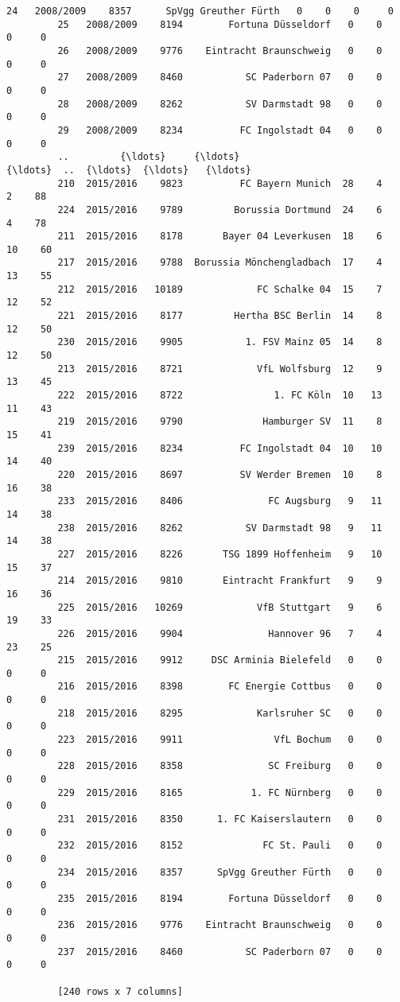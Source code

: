 \documentclass[11pt]{article}
\begin{document}
\begin{Verbatim}[commandchars=\\\{\}]
         24   2008/2009    8357      SpVgg Greuther Fürth   0    0    0     0
         25   2008/2009    8194        Fortuna Düsseldorf   0    0    0     0
         26   2008/2009    9776    Eintracht Braunschweig   0    0    0     0
         27   2008/2009    8460           SC Paderborn 07   0    0    0     0
         28   2008/2009    8262           SV Darmstadt 98   0    0    0     0
         29   2008/2009    8234          FC Ingolstadt 04   0    0    0     0
         ..         {\ldots}     {\ldots}                       {\ldots}  ..  {\ldots}  {\ldots}   {\ldots}
         210  2015/2016    9823          FC Bayern Munich  28    4    2    88
         224  2015/2016    9789         Borussia Dortmund  24    6    4    78
         211  2015/2016    8178       Bayer 04 Leverkusen  18    6   10    60
         217  2015/2016    9788  Borussia Mönchengladbach  17    4   13    55
         212  2015/2016   10189             FC Schalke 04  15    7   12    52
         221  2015/2016    8177         Hertha BSC Berlin  14    8   12    50
         230  2015/2016    9905           1. FSV Mainz 05  14    8   12    50
         213  2015/2016    8721             VfL Wolfsburg  12    9   13    45
         222  2015/2016    8722                1. FC Köln  10   13   11    43
         219  2015/2016    9790              Hamburger SV  11    8   15    41
         239  2015/2016    8234          FC Ingolstadt 04  10   10   14    40
         220  2015/2016    8697          SV Werder Bremen  10    8   16    38
         233  2015/2016    8406               FC Augsburg   9   11   14    38
         238  2015/2016    8262           SV Darmstadt 98   9   11   14    38
         227  2015/2016    8226       TSG 1899 Hoffenheim   9   10   15    37
         214  2015/2016    9810       Eintracht Frankfurt   9    9   16    36
         225  2015/2016   10269             VfB Stuttgart   9    6   19    33
         226  2015/2016    9904               Hannover 96   7    4   23    25
         215  2015/2016    9912     DSC Arminia Bielefeld   0    0    0     0
         216  2015/2016    8398        FC Energie Cottbus   0    0    0     0
         218  2015/2016    8295             Karlsruher SC   0    0    0     0
         223  2015/2016    9911                VfL Bochum   0    0    0     0
         228  2015/2016    8358               SC Freiburg   0    0    0     0
         229  2015/2016    8165            1. FC Nürnberg   0    0    0     0
         231  2015/2016    8350      1. FC Kaiserslautern   0    0    0     0
         232  2015/2016    8152              FC St. Pauli   0    0    0     0
         234  2015/2016    8357      SpVgg Greuther Fürth   0    0    0     0
         235  2015/2016    8194        Fortuna Düsseldorf   0    0    0     0
         236  2015/2016    9776    Eintracht Braunschweig   0    0    0     0
         237  2015/2016    8460           SC Paderborn 07   0    0    0     0
         
         [240 rows x 7 columns]
\end{Verbatim}
            
\end{document}

